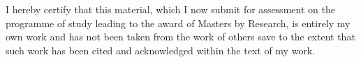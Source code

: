 
\begin{declaration}

I hereby certify that this material, which I now
submit for assessment on the programme of study leading to the award
of Masters by Research, is entirely my own work and has not been taken
from the work of others save to the extent that such work has been cited and acknowledged within the text of my work.


\end{declaration}

